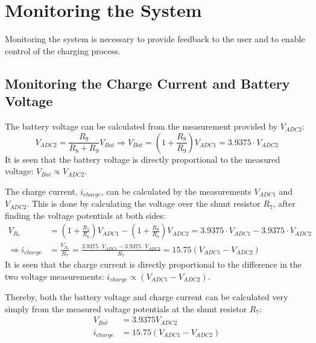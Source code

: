 \documentclass[../report.tex]{subfiles}
\begin{document}
\section{Monitoring the System} \label{sec:monitor}
Monitoring the system is necessary to provide feedback to the user and to enable control of the charging process.

\subsection{Monitoring the Charge Current and Battery Voltage}
The battery voltage can be calculated from the measurement provided by $V_{ADC2}$:
\begin{equation}
    V_{ADC2}  = \frac{R_9}{R_8 + R_9} V_{Bat} \Rightarrow V_{Bat} = \left( 1 + \frac{R_8}{R_9} \right) V_{ADC1} = 3.9375 \cdot V_{ADC2}
\end{equation}
It is seen that the battery voltage is directly proportional to the measured voltage: $V_{Bat} \propto V_{ADC2}$.

The charge current, $i_{charge}$, can be calculated by the measurements $V_{ADC1}$ and $V_{ADC2}$. This is done by calculating the voltage over the shunt resistor $R_7$, after finding the voltage potentials at both sides:
\begin{align}
    V_{R_7} &= \left( 1 + \frac{R_5}{R_6} \right)V_{ADC1} - \left( 1 + \frac{R_8}{R_9} \right) V_{ADC2} = 3.9375 \cdot V_{ADC1} - 3.9375 \cdot V_{ADC2} \\
    \Rightarrow i_{charge} &= \frac{V_{R_7}}{R_7} = \frac{3.9375 \cdot V_{ADC1} - 3.9375 \cdot V_{ADC2}}{R_7} = 15.75\left( V_{ADC1} - V_{ADC2} \right) 
\end{align}
It is seen that the charge current is directly proportional to the difference in the two voltage measurements: $i_{charge} \propto \left( V_{ADC1} - V_{ADC2}  \right)$.

Thereby, both the battery voltage and charge current can be calculated very simply from the measured voltage potentials at the shunt resistor $R_7$:
\begin{align}
    V_{Bat} &= 3.9375 V_{ADC2}\\
    i_{charge} &= 15.75\left( V_{ADC1} - V_{ADC2} \right)
\end{align}
\end{document}
